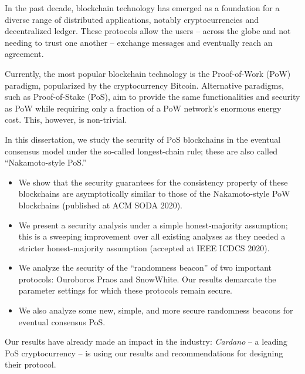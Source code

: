 
In the past decade, blockchain technology has emerged as a foundation for a diverse range of distributed applications, notably cryptocurrencies and decentralized ledger. These protocols allow the users -- across the globe and not needing to trust one another -- exchange messages and eventually reach an agreement. 

 

Currently, the most popular blockchain technology is the Proof-of-Work (PoW) paradigm, popularized by the cryptocurrency Bitcoin. Alternative paradigms, such as Proof-of-Stake (PoS), aim to provide the same functionalities and security as PoW while requiring only a fraction of a PoW network's enormous energy cost. This, however, is non-trivial.

 

In this dissertation, we study the security of PoS blockchains in the eventual consensus model under the so-called longest-chain rule; 
these are also called ``Nakamoto-style PoS.''
\begin{itemize}
  \item We show that the security guarantees 
  for the consistency property of these blockchains are asymptotically similar 
  to those of the Nakamoto-style PoW blockchains (published at ACM SODA 2020). 

  \item We present a security analysis under a simple honest-majority assumption; this is a sweeping improvement over all existing analyses as they needed a stricter honest-majority assumption (accepted at IEEE ICDCS 2020).

  \item We analyze the security of the ``randomness beacon'' of two important protocols: Ouroboros Praos and SnowWhite. Our results demarcate the parameter settings for which these protocols remain secure. 

  \item We also analyze some new, simple, and more secure randomness beacons for eventual consensus PoS.
\end{itemize}

Our results have already made an impact in the industry: \emph{Cardano} -- a leading PoS cryptocurrency -- is using our results and recommendations for designing their protocol.

